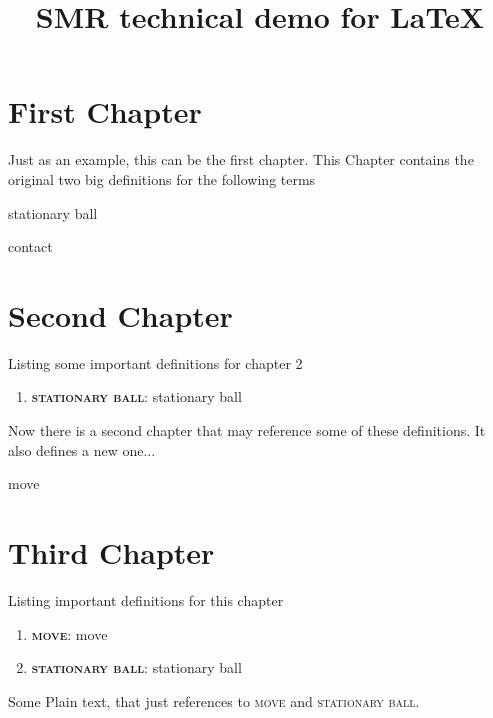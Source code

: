 \documentclass[fontsize=11pt, paper=a4]{report}
\newcommand{\refformat}[1]{{\textsc{#1}}}			 %
\newcommand{\defformat}[1]{{\textbf{\refformat{#1}}}}%
\newcommand{\dtterm}[1]{
\begin{Definition}[name=\defformat{#1}]
	\label{#1}
	 \glsdesc{#1}
\end{Definition}
}
\newcommand{\tref}[1]{\refformat{{#1}}}
\newcommand{\tterm}[1]{
	\defformat{#1}: \glsdesc{#1}
}
\begin{document}
\title{SMR technical demo for \LaTeX}
\maketitle

\pagestyle{plain}%
\chapter*{First Chapter}
Just as an example, this can be the first chapter. This Chapter contains the original two big definitions for the following terms
\dtterm{stationary ball}
\dtterm{contact}

\newpage
\chapter*{Second Chapter}
Listing some important definitions for chapter 2
\begin{enumerate}
	\item{\tterm{stationary ball}}
\end{enumerate}
Now there is a second chapter that may reference some of these definitions. It also defines a new one...
\dtterm{move}


\newpage
\chapter*{Third Chapter}
Listing important definitions for this chapter
\begin{enumerate}
	\item{\tterm{move}}
	\item{\tterm{stationary ball}}
\end{enumerate}
Some Plain text, that just references to \tref{move} and \tref{stationary ball}.

\clearpage

\printglossary[title=Definitions, toctitle=List of terms, nonumberlist]
\end{document}
